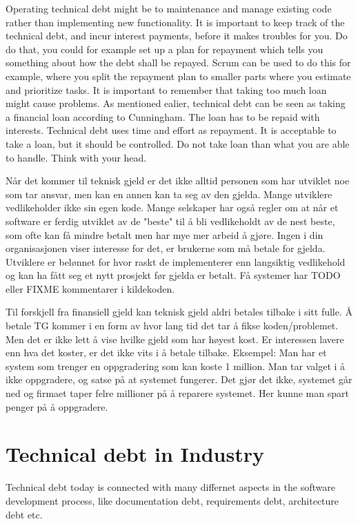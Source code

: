 Operating technical debt might be to maintenance and manage existing code rather than implementing new functionality. It is important to keep track of the technical debt, and incur interest payments, before it makes troubles for you. Do do that, you could for example set up a plan for repayment which tells you something about how the debt shall be repayed. Scrum can be used to do this for example, where you split the repayment plan to smaller parts where you estimate and prioritize tasks. It is important to remember that taking too much loan might cause problems. As mentioned ealier, technical debt can be seen as taking a financial loan according to Cunningham. The loan has to be repaid with interests. Technical debt uses time and effort as repayment. It is acceptable to take a loan, but it should be controlled. Do not take loan than what you are able to handle. Think with your head.


Når det kommer til teknisk gjeld er det ikke alltid personen som har utviklet noe som tar ansvar, men kan en annen kan ta seg av den gjelda. Mange utviklere vedlikeholder ikke sin egen kode. Mange selskaper har også regler om at når et software er ferdig utviklet av de "beste" til å bli vedlikeholdt av de nest beste, som ofte kan få mindre betalt men har mye mer arbeid å gjøre. Ingen i din organisasjonen viser interesse for det, er brukerne som må betale for gjelda. Utviklere er belønnet for hvor raskt de implementerer enn langsiktig vedlikehold og kan ha fått seg et nytt prosjekt før gjelda er betalt. Få systemer har TODO eller FIXME kommentarer i kildekoden. 

Til forskjell fra finansiell gjeld kan teknisk gjeld aldri betales tilbake i sitt fulle. Å betale TG kommer i en form av hvor lang tid det tar å fikse koden/problemet. Men det er ikke lett å vise hvilke gjeld som har høyest kost. Er interessen lavere enn hva det koster, er det ikke vits i å betale tilbake. Eksempel: Man har et system som trenger en oppgradering som kan koste 1 million. Man tar valget i å ikke oppgradere, og satse på at systemet fungerer. Det gjør det ikke, systemet går ned og firmaet taper felre millioner på å reparere systemet. Her kunne man spart penger på å oppgradere.



\section{Technical debt in Industry}
Technical debt today is connected with many differnet aspects in the software development process, like documentation debt, requirements debt, architecture debt etc. 

